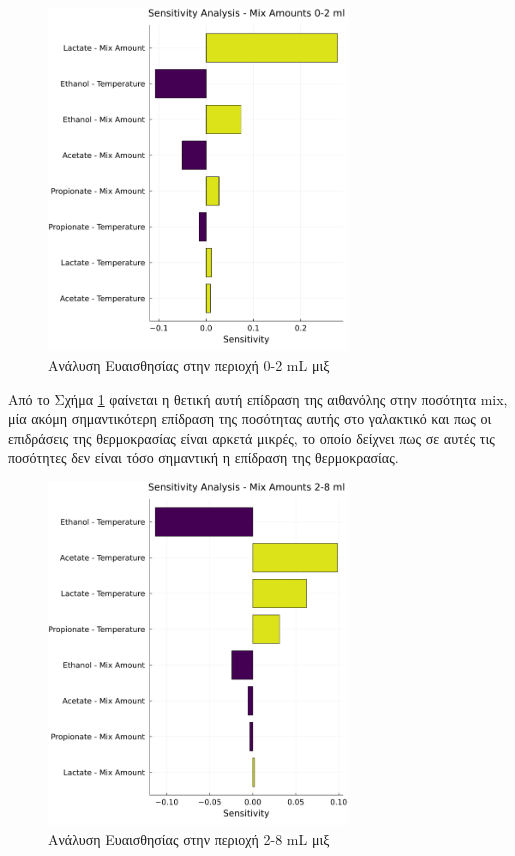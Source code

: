 \documentclass[11pt]{report}
\begin{document}
\begin{figure}[htbp]
\centering
\includegraphics[width=300px]{../plots/sensitivity/tornado_low.png}
\caption{\label{fig:org8c06abd}Ανάλυση Ευαισθησίας στην περιοχή 0-2 mL μιξ}
\end{figure}

Από το Σχήμα \ref{fig:org8c06abd} φαίνεται η θετική αυτή επίδραση της αιθανόλης στην ποσότητα \acrshort{mix}, μία ακόμη σημαντικότερη επίδραση της ποσότητας αυτής στο γαλακτικό και πως οι επιδράσεις της θερμοκρασίας είναι αρκετά μικρές, το οποίο δείχνει πως σε αυτές τις ποσότητες δεν είναι τόσο σημαντική η επίδραση της θερμοκρασίας.

\begin{figure}[htbp]
\centering
\includegraphics[width=300px]{../plots/sensitivity/tornado_high.png}
\caption{\label{fig:orgd4b8aeb}Ανάλυση Ευαισθησίας στην περιοχή 2-8 mL μιξ}
\end{figure}
\end{document}

